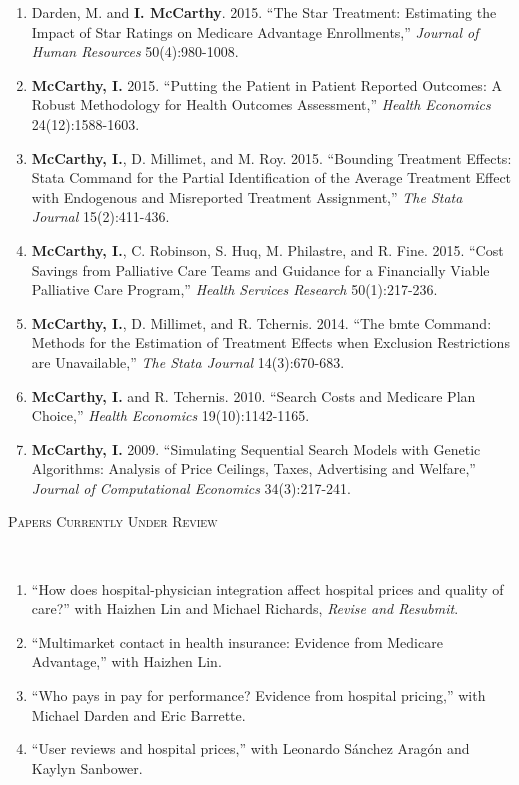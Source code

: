 \documentclass[9pt]{article}
\newenvironment{changemargin}[2]{%
  \begin{list}{}{%
    \setlength{\topsep}{0pt}%
    \setlength{\leftmargin}{#1}%
    \setlength{\rightmargin}{#2}%
    \setlength{\listparindent}{\parindent}%
    \setlength{\itemindent}{\parindent}%
    \setlength{\parsep}{\parskip}%
  }%
  \item[]}{\end{list}
}
\newcommand{\lineover}{
	\begin{changemargin}{-0.05in}{-0.05in}
		\vspace*{-8pt}
		\hrulefill \\
		\vspace*{-2pt}
	\end{changemargin}
}
\newcommand{\header}[1]{
	\begin{changemargin}{-0.5in}{-0.5in}
		\scshape{#1}\\
  	\lineover
	\end{changemargin}
}
\newenvironment{body} {
	\vspace*{-16pt}
	\begin{changemargin}{-0.25in}{-0.5in}
  }	
	{\end{changemargin}
}
\begin{document}
\begin{body}
\begin{enumerate}
    \item Darden, M. and \textbf{I. McCarthy}. 2015. ``The Star Treatment: Estimating the Impact of Star Ratings on Medicare Advantage Enrollments,'' \textit{Journal of Human Resources} 50(4):980-1008.
    \item \textbf{McCarthy, I.} 2015. ``Putting the Patient in Patient Reported Outcomes: A Robust Methodology for Health Outcomes Assessment,'' \textit{Health Economics} 24(12):1588-1603.
    \item \textbf{McCarthy, I.}, D. Millimet, and M. Roy. 2015. ``Bounding Treatment Effects: Stata Command for the Partial Identification of the Average Treatment Effect with Endogenous and Misreported Treatment Assignment,'' \textit{The Stata Journal} 15(2):411-436.
    \item \textbf{McCarthy, I.}, C. Robinson, S. Huq, M. Philastre, and R. Fine. 2015. ``Cost Savings from Palliative Care Teams and Guidance for a Financially Viable Palliative Care Program,'' \textit{Health Services Research} 50(1):217-236.
    \item \textbf{McCarthy, I.}, D. Millimet, and R. Tchernis. 2014. ``The bmte Command: Methods for the Estimation of Treatment Effects when Exclusion Restrictions are Unavailable,'' \textit{The Stata Journal} 14(3):670-683.
    \item \textbf{McCarthy, I.} and R. Tchernis. 2010. ``Search Costs and Medicare Plan Choice,'' \textit{Health Economics} 19(10):1142-1165.
    \item \textbf{McCarthy, I.} 2009. ``Simulating Sequential Search Models with Genetic Algorithms: Analysis of Price Ceilings, Taxes, Advertising and Welfare,'' \textit{Journal of Computational Economics} 34(3):217-241.
  \end{enumerate}
\end{body}
\smallskip

\header{Papers Currently Under Review}
\begin{body}
  \vspace{14pt}
  \begin{enumerate}
    \item ``How does hospital-physician integration affect hospital prices and quality of care?'' with Haizhen Lin and Michael Richards, \textit{Revise and Resubmit}.
    \item ``Multimarket contact in health insurance: Evidence from Medicare Advantage,'' with Haizhen Lin.
    \item ``Who pays in pay for performance? Evidence from hospital pricing,'' with Michael Darden and Eric Barrette.
    \item ``User reviews and hospital prices,'' with Leonardo S\'{a}nchez Arag\'{o}n and Kaylyn Sanbower.
  \end{enumerate}
\end{body}
\smallskip
\end{document}
